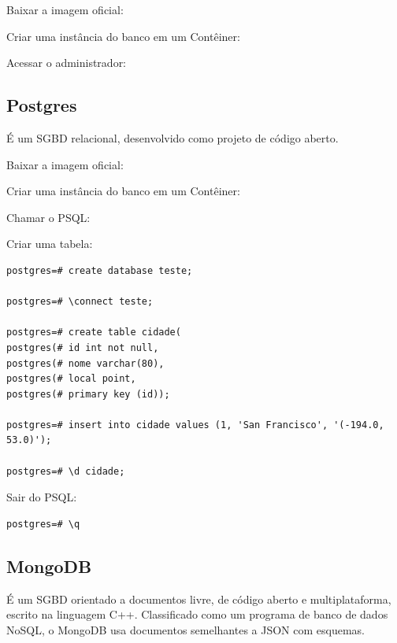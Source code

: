 \documentclass[a4paper,11pt]{article}
\begin{document}
Baixar a imagem oficial: \\

Criar uma instância do banco em um Contêiner: \\

Acessar o administrador: \\

\subsection{Postgres}
É um SGBD relacional, desenvolvido como projeto de código aberto. 

Baixar a imagem oficial: \\

Criar uma instância do banco em um Contêiner: \\

Chamar o PSQL: \\

Criar uma tabela:
\begin{lstlisting}
postgres=# create database teste;

postgres=# \connect teste;

postgres=# create table cidade(
postgres(# id int not null,
postgres(# nome varchar(80),
postgres(# local point,
postgres(# primary key (id));

postgres=# insert into cidade values (1, 'San Francisco', '(-194.0, 53.0)');

postgres=# \d cidade;
\end{lstlisting}

Sair do PSQL:
\begin{lstlisting}
postgres=# \q
\end{lstlisting}

\subsection{MongoDB}
É um SGBD orientado a documentos livre, de código aberto e multiplataforma, escrito na linguagem C++. Classificado como um programa de banco de dados NoSQL, o MongoDB usa documentos semelhantes a JSON com esquemas. 
\end{document}
